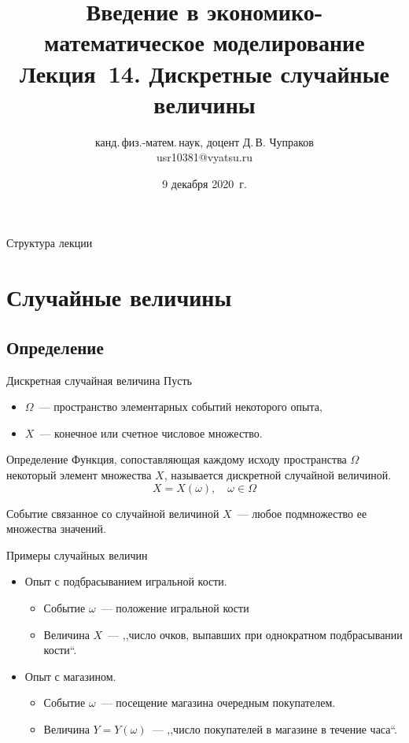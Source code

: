 \documentclass[unicode,11pt,notheorems,xcolor=table]{beamer}
\author[Д.\,В. Чупраков]{канд.\,физ.-матем.\,наук, доцент Д.\,В. Чупраков\\[6pt] usr10381@vyatsu.ru}
\institute[ВятГУ]{ФГБОУ ВО Вятский государственный университет}
\title[Лекция~14. Дискретные случайные величины]{
	Введение в экономико-математическое моделирование\\[12pt]
	Лекция~14. Дискретные случайные величины}
\date{9 декабря 2020~г.}
\begin{document}
\maketitle

\begin{frame}{Структура лекции}{}
	\tableofcontents
\end{frame}

\section{Случайные величины}
\subsection{Определение}


\begin{frame}{Дискретная случайная величина}{}
    Пусть 
    \begin{itemize}
        \item $\Omega$~--- пространство элементарных событий некоторого опыта, 
        \item $X$~--- конечное или счетное  числовое множество.
    \end{itemize}

    \begin{block}{Определение}
    Функция, сопоставляющая каждому исходу пространства $\Omega$ некоторый элемент множества $X$, называется \alert{дискретной случайной величиной.}
    $$
        X = X(\omega),\quad \omega \in \Omega
    $$
    \end{block}

    \alert{Событие} связанное со случайной величиной $X$~--- любое подмножество ее множества значений.
\end{frame}

\begin{frame}{Примеры случайных величин}{}
    
    \begin{itemize}
        \item Опыт с подбрасыванием игральной кости. 
        \begin{itemize}
            \item Событие $\omega$~--- положение игральной кости 
            \item Величина $X$~--- ,,число очков, выпавших при однократном подбрасывании кости``.
        \end{itemize}
        
        \item Опыт с магазином. 
        \begin{itemize}
            \item Событие $\omega$~--- посещение магазина очередным покупателем.
            \item Величина $Y = Y(\omega)$~--- ,,число покупателей в магазине в течение часа``.
        \end{itemize}
    \end{itemize}
\end{frame}
\end{document}
